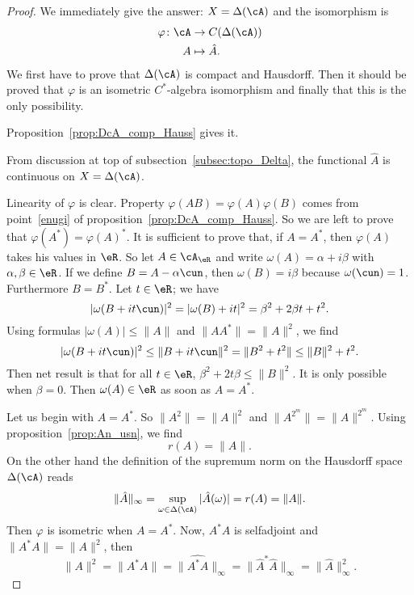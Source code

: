 \begin{proof}
	We immediately give the answer: $X=\Delta(\cA)$ and the isomorphism is
	\begin{equation}
		\begin{aligned}
			\varphi \colon \cA & \to C(\Delta(\cA)) \\
			A                  & \mapsto \hat A.
		\end{aligned}
	\end{equation}
	We first have to prove that $\Delta(\cA)$ is compact and Hausdorff. Then it should be proved that $\varphi$ is an isometric $C^*$-algebra isomorphism and finally that this is the only possibility.


	Proposition~\ref{prop:DcA_comp_Hauss} gives it.


	From discussion at top of subsection~\ref{subsec:topo_Delta}, the functional $\hat A$ is continuous on $X=\Delta(\cA)$.


	Linearity of $\varphi$ is clear. Property $\varphi(AB)=\varphi(A)\varphi(B)$ comes from point~\ref{enugi} of proposition~\ref{prop:DcA_comp_Hauss}. So we are left to prove that $\varphi(A^*)=\varphi(A)^*$. It is sufficient to prove that, if $A=A^*$, then $\varphi(A)$ takes his values in $\eR$. So let $A\in\cA_{\eR}$ and write $\omega(A)=\alpha+i\beta$ with $\alpha,\beta\in\eR$. If we define $B=A-\alpha\cun$, then $\omega(B)=i\beta$ because $\omega(\cun)=1$. Furthermore $B=B^*$. Let $t\in\eR$; we have
	\begin{equation}  \label{eq:rcinq}
		|\omega(B+it\cun)|^2=|\omega(B)+it|^2
		=\beta^2+2\beta t+t^2.
	\end{equation}
	Using formulas $|\omega(A)|\leq\|A\|$ and $\|AA^*\|=\|A\|^2$, we find
	\begin{equation}
		|\omega(B+it\cun)|^2\leq\|B+it\cun\|^2
		=\|B^2+t^2\|
		\leq \|B\|^2+t^2.
	\end{equation}
	Then net result is that for all $t\in\eR$,   $\beta^2+2t\beta\leq \|B\|^2$. It is only possible when $\beta=0$. Then $\omega(A)\in\eR$ as soon as $A=A^*$.


	Let us begin with $A=A^*$. So $\|A^2\|=\|A\|^2$ and $\|A^{2^m}\|=\|A\|^{2^m}$. Using proposition~\ref{prop:An_usn}, we find
	\[
		r(A)=\|A\|.
	\]
	On the other hand the definition of the supremum norm on the Hausdorff space $\Delta(\cA)$ reads
	\begin{equation} \label{eq:AinfA }
		\|\hat A\|_{\infty}=\sup_{\omega\in\Delta(\cA)}|\hat A(\omega)|=r(A)=\|A\|.
	\end{equation}
	Then $\varphi$ is isometric when $A=A^*$. Now, $A^*A$ is selfadjoint and $\|A^*A\|=\|A\|^2$, then
	\[
		\|A\|^2=\|A^*A\|=\|\widehat{A^*A}\|_{\infty}=\|{\hat A}^*\hat A\|_{\infty}=\|\hat A\|^2_{\infty}.
	\]


\end{proof}
